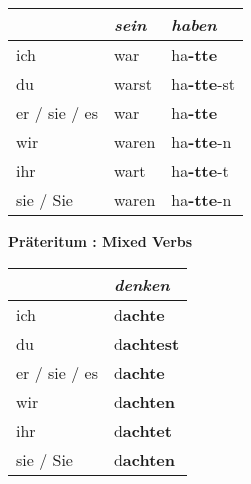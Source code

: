 \documentclass[a4paper,twocolumn,10pt]{article}
\newcommand{\tabularxtable}[3]
{

	\vspace{0.5cm}
	\nolinenumbers

	\begin{tabularx}{#1}{#2}
		#3
	\end{tabularx}

	\linenumbers
	\vspace{0.5cm}
}
\begin{document}
\tabularxtable
{0.95\linewidth}
{l|XX}
{
	&
	\textit{sein} &
	\textit{haben} \\
	\midrule

	\cellcolor{table-subtopic} ich &
	war &
	ha\textcolor{green-goethe}{\textbf{-tte}} \\

	\cellcolor{table-subtopic} du &
	\cellcolor{table-alternating-blue} warst &
	\cellcolor{table-alternating-blue} ha\textcolor{green-goethe}{\textbf{-tte}}-st \\

	\cellcolor{table-subtopic} er / sie / es &
	war&
	ha\textcolor{green-goethe}{\textbf{-tte}} \\

	\cellcolor{table-subtopic} wir &
	\cellcolor{table-alternating-blue} waren  &
	\cellcolor{table-alternating-blue}
	ha\textcolor{green-goethe}{\textbf{-tte}}-n \\

	\cellcolor{table-subtopic} ihr &
	wart &
	ha\textcolor{green-goethe}{\textbf{-tte}}-t \\


	\cellcolor{table-subtopic} sie / Sie &
	\cellcolor{table-alternating-blue} waren &
	\cellcolor{table-alternating-blue} ha\textcolor{green-goethe}{\textbf{-tte}}-n \\

}



\textbf{Präteritum : Mixed Verbs}\cite{em}
\tabularxtable
{0.95\linewidth}
{l|X}
{
	&
	\textit{denken} \\
	\midrule

	\cellcolor{table-subtopic} ich &
	d\textcolor{green-goethe}{\textbf{achte}} \\

	\cellcolor{table-subtopic} du &
	\cellcolor{table-alternating-blue}
	d\textcolor{green-goethe}{\textbf{achtest}} \\

	\cellcolor{table-subtopic} er / sie / es &
	d\textcolor{green-goethe}{\textbf{achte}} \\

	\cellcolor{table-subtopic} wir &
	\cellcolor{table-alternating-blue} d\textcolor{green-goethe}{\textbf{achten}} \\

	\cellcolor{table-subtopic} ihr &
	d\textcolor{green-goethe}{\textbf{achtet}} \\

	\cellcolor{table-subtopic} sie / Sie &
	\cellcolor{table-alternating-blue} d\textcolor{green-goethe}{\textbf{achten}} \\



}
\end{document}
